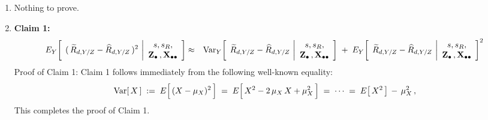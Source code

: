 \begin{enumerate}
\item
    Nothing to prove.
\item
    \textbf{Claim 1:}\quad
    \begin{eqnarray*}
    E_{Y}\!\left[\;\,
        (\,\widetilde{R}_{d,Y/Z} - \widehat{R}_{d,Y/Z}\,)^{2}
        \,\left\vert
        \begin{array}{c}
            s,s_{R},
            \\
            \mathbf{Z}_{\bullet}\,,\mathbf{X}_{\bullet\bullet}
            \end{array}
        \right.
        \!\right]
    & \approx &
        \textnormal{Var}_{Y}\!\left[\;\,
            \widetilde{R}_{d,Y/Z} - \widehat{R}_{d,Y/Z}
            \,\left\vert
            \begin{array}{c}
                s,s_{R},
                \\
                \mathbf{Z}_{\bullet}\,,\mathbf{X}_{\bullet\bullet}
                \end{array}
            \right.
            \!\right]
        \; + \;
        E_{Y}\!\left[\;\,
            \widetilde{R}_{d,Y/Z} - \widehat{R}_{d,Y/Z}
            \,\left\vert
            \begin{array}{c}
                s,s_{R},
                \\
                \mathbf{Z}_{\bullet}\,,\mathbf{X}_{\bullet\bullet}
                \end{array}
            \right.
            \!\right]^{2}
    \end{eqnarray*}
    \vskip 0.1cm
    \noindent
    Proof of Claim 1:\;\;
    Claim 1 follows immediately from the following well-known equality:
    \begin{equation*}
    \Var[\,X\,]
    \; := \;
        E\!\left[\,\overset{{\color{white}.}}{(X - \mu_{X})^{2}}\,\right]
    \; = \;
        E\!\left[\,\overset{{\color{white}.}}{X^{2} - 2\,\mu_{X}\,X + \mu_{X}^{2}}\,\right]
    \; = \;
        \cdots
    \; = \;
        E\!\left[\,X^{2}\,\right] \,-\, \mu_{X}^{2}\,,
    \end{equation*}
    This completes the proof of Claim 1.


\end{enumerate}

